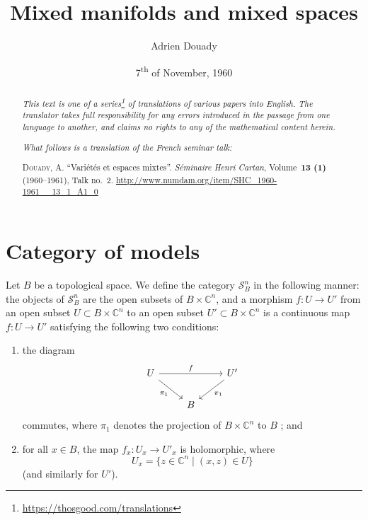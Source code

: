 \documentclass{article}
\title{Mixed manifolds and mixed spaces}
\author{Adrien Douady}
\date{7\textsuperscript{th} of November, 1960}
\newcommand{\doctype}{French seminar talk}
\newcommand{\origcit}{%
  \textsc{Douady, A.}
  ``Vari\'{e}t\'{e}s et espaces mixtes''.
  \emph{S\'{e}minaire Henri Cartan}, Volume~\textbf{13 (1)} (1960--1961), Talk no.~2.
  {\url{http://www.numdam.org/item/SHC_1960-1961__13_1_A1_0}}%
}
\newcommand{\CC}{\mathbb{C}}
\newcommand{\oldpage}[1]{\marginpar{\footnotesize$\Big\vert$ \textit{p.~#1}}}
\begin{document}
\maketitle
\thispagestyle{fancy}

\renewcommand{\abstractname}{Translator's note.}

\begin{abstract}
  \renewcommand*{\thefootnote}{\fnsymbol{footnote}}
  \emph{This text is one of a series\footnote{\url{https://thosgood.com/translations}} of translations of various papers into English.}
  \emph{The translator takes full responsibility for any errors introduced in the passage from one language to another, and claims no rights to any of the mathematical content herein.}

  \medskip
  
  \emph{What follows is a translation of the \doctype:}

  \medskip\noindent
  \origcit
\end{abstract}

\setcounter{footnote}{0}

\tableofcontents
\bigskip



\section{Category of models}
\label{I}

\oldpage{2-01}
Let $B$ be a topological space.
We define the category $\mathscr{S}_B^n$ in the following manner: the objects of $\mathscr{S}_B^n$ are the open subsets of $B\times\CC^n$, and a morphism $f\colon U\to U'$ from an open subset $U\subset B\times\CC^n$ to an open subset $U'\subset B\times\CC^n$ is a continuous map $f\colon U\to U'$ satisfying the following two conditions:
\begin{enumerate}
  \item the diagram
    \[
      \begin{tikzcd}
        U \ar[rr,"f"] \ar[dr,swap,"\pi_1"]
        && U' \ar[dl,"\pi_1"]
      \\&B&
      \end{tikzcd}
    \]
    commutes, where $\pi_1$ denotes the projection of $B\times\CC^n$ to $B$ ; and
  \item for all $x\in B$, the map $f_x\colon U_x\to U'_x$ is holomorphic, where
    \[
      U_x = \{z\in\CC^n \mid (x,z)\in U\}
    \]
    (and similarly for $U'$).
\end{enumerate}
\end{document}
